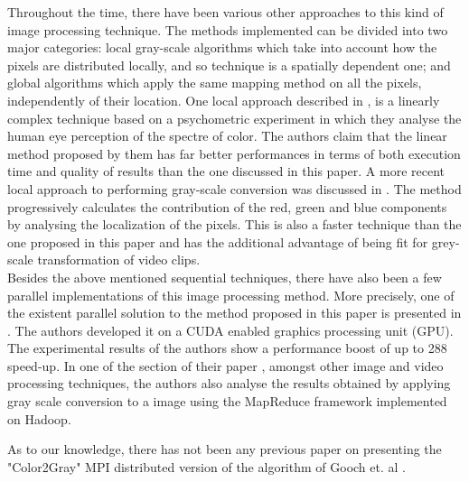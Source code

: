\documentclass[conference]{IEEEtran}
\begin{document}
Throughout the time, there have been various other approaches to this kind of image processing technique. The methods implemented can be divided into two major categories: local gray-scale algorithms which take into account how the pixels are distributed locally, and so technique is a spatially dependent one; and global algorithms which apply the same mapping method on all the pixels, independently of their location. One local approach described in \cite{neumann2007efficient}, is a linearly complex technique based on a psychometric experiment in which they analyse the human eye perception of the spectre of color. The authors claim that the linear method proposed by them has far better performances in terms of both execution time and quality of results than the one discussed in this paper.
A more recent local approach to performing gray-scale conversion was discussed in \cite{lim2012novel}. The method progressively calculates the contribution of the red, green and blue components by analysing the localization of the pixels. This is also a faster technique than the one proposed in this paper and has the additional advantage of being fit for grey-scale transformation of video clips.\\

Besides the above mentioned sequential techniques, there have also been a few parallel implementations of this image processing method. More precisely, one of the existent parallel solution to the method proposed in this paper is presented in \cite{daparallel}. The authors developed it on a CUDA enabled graphics processing unit (GPU). The experimental results of the authors show a performance boost of up to 288 speed-up.
In one of the section of their paper \cite{yamamoto2013parallel}, amongst other image and video processing techniques, the authors also analyse the results obtained by applying gray scale conversion to a image using the MapReduce framework implemented on Hadoop.

As to our knowledge, there has not been any previous paper on presenting the "Color2Gray" MPI distributed version of the algorithm of Gooch et. al \cite{gooch2005color2gray}.
\end{document}
